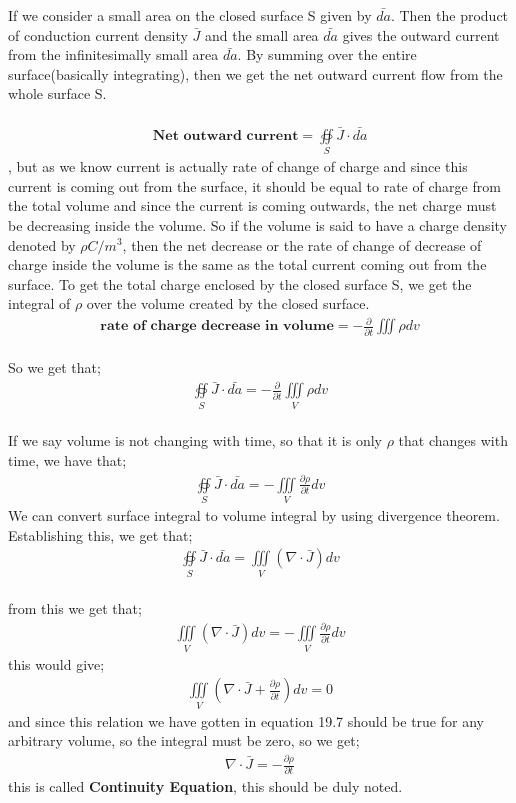  
 If we consider a small area on the closed surface S given by $\bar{da}$. Then the product of conduction current density $\bar{J}$ and the small area  $\bar{da}$ gives the outward current from the infinitesimally small area  $\bar{da}$. By summing over the entire surface(basically integrating), then we get the net outward current flow from the whole surface S. \\\\
\begin{align}
\textbf{Net outward current}= \oiint\limits_S\bar{J}\cdot\bar{da}
\end{align},
 but as we know current is actually rate of change of charge and since this current is coming out from the surface, it should be equal to rate of charge from the total volume and since the current is coming outwards, the net charge must be decreasing inside the volume. So if the volume is said to have a charge density denoted by $\rho C/m^{3}$, then the net decrease or the rate of change of decrease of charge inside the volume is the same as the total current coming out from the surface.  To get the total charge enclosed by the closed surface S, we get the integral of $\rho$ over the volume created by the closed surface.\\
	\begin{align}
\textbf{rate of charge decrease in volume}	= -\frac{\partial}{\partial t}\iiint \rho dv
	\end{align}
	\\ So we get that;
	\begin{align}
	\oiint\limits_S\bar{J}\cdot\bar{da} =  -\frac{\partial}{\partial t}\iiint\limits_V\rho dv
	\end{align}
	\\ If we say volume is not changing with time, so that it is only $\rho$ that  changes with time, we have that;
	\begin{align}
	\oiint\limits_S\bar{J}\cdot\bar{da} = -\iiint\limits_V\frac{\partial\rho}{\partial t}dv
		\end{align}
	 We can convert surface integral to volume integral by  using divergence theorem. Establishing this, we get that;
	\begin{align}
		\oiint\limits_S\bar{J}\cdot\bar{da} = \iiint\limits_V(\nabla\cdot\bar{J})dv
	\end{align}
	\\ from this we get that;
	\begin{align}
	\iiint\limits_V(\nabla\cdot\bar{J})dv = -\iiint\limits_V\frac{\partial\rho}{\partial t}dv
	\end{align}
  this would give;
  \begin{align}
  \iiint\limits_V(\nabla\cdot\bar{J} + \frac{\partial\rho}{\partial t} )dv = 0
  \end{align}
  and since this relation we have gotten in equation 19.7 should be true for any arbitrary volume, so the integral must be zero, so we get;
  \begin{align}
  \nabla\cdot\bar{J} = -\frac{\partial\rho}{\partial t}
  \end{align}
  this is called \textbf{Continuity Equation}, this should be duly noted.
  
